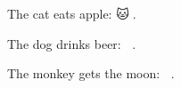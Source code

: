 \documentclass[varwidth, margin=4pt]{standalone}
\begin{document}
The cat eats apple:  {\EmojiFont 🐱🍎}. \par
The dog drinks beer: {\EmojiFont 🐶🍺}. \par
The monkey gets the moon: {\EmojiFont 🙈🌛}.
\end{document}

